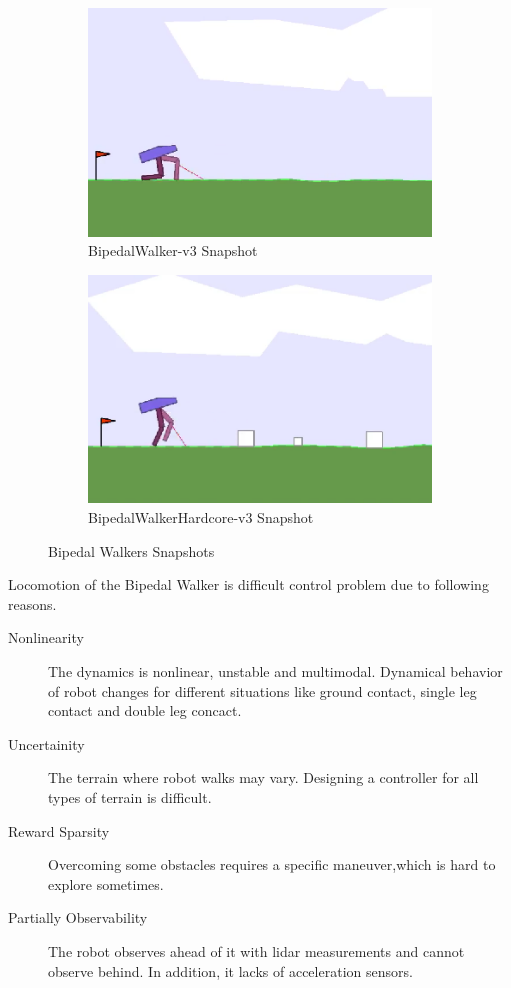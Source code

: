 \begin{figure}
	\begin{subfigure}{.5\textwidth}
		\centering
		\includegraphics[width=0.9\linewidth]{figures/bipedal/classic.png}
		\caption{BipedalWalker-v3 Snapshot}
		\label{fig:bipedal_walker_classic}
	\end{subfigure}
	\begin{subfigure}{.5\textwidth}
		\centering
		\includegraphics[width=0.9\linewidth]{figures/bipedal/hardcore.png}
		\caption{BipedalWalkerHardcore-v3 Snapshot}
		\label{fig:bipedal_walker_hardcore}
	\end{subfigure}
	\caption{Bipedal Walkers Snapshots}
	\label{fig:bipedal_walkers}
\end{figure}

Locomotion of the Bipedal Walker is difficult control problem due to following reasons. 
\begin{description}
	\item[Nonlinearity] The dynamics is nonlinear, unstable and multimodal. 
	Dynamical behavior of robot changes for different situations 
	like ground contact, single leg contact and double leg concact.
	\item[Uncertainity] The terrain where robot walks may vary. 
	Designing a controller for all types of terrain is difficult.
	\item[Reward Sparsity] Overcoming some obstacles requires a specific maneuver,which is hard to explore sometimes.	
	\item[Partially Observability] The robot observes 
	ahead of it with lidar measurements and cannot observe behind. 
	In addition, it lacks of acceleration sensors.
\end{description}

